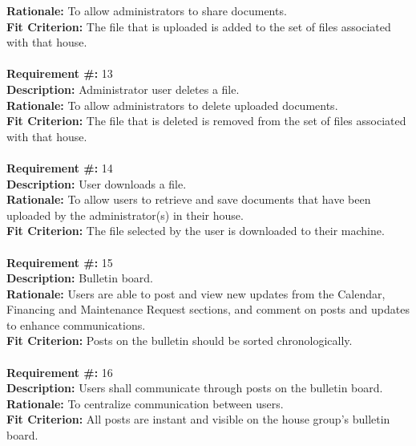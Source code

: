 \documentclass[12pt]{article}
\begin{document}
      \textbf{Rationale:} To allow administrators to share documents. \\
      \textbf{Fit Criterion:} The file that is uploaded is added to the set of
      files associated with that house. \\ \\
\textbf{Requirement \#:} 13
       \\
      \textbf{Description:} Administrator user deletes a file. \\
      \textbf{Rationale:} To allow administrators to delete uploaded documents. \\
      \textbf{Fit Criterion:} The file that is deleted is removed from the set of
      files associated with that house. \\ \\
\textbf{Requirement \#:} 14
       \\
      \textbf{Description:} User downloads a file. \\
      \textbf{Rationale:} To allow users to retrieve and save documents that 
have
      been uploaded by the administrator(s) in their house. \\
      \textbf{Fit Criterion:} The file selected by the user is downloaded to
      their machine. \\ \\
\textbf{Requirement \#:} 15
      \\
      \textbf{Description: }{Bulletin board.} \\
      \textbf{Rationale: }{Users are able to post and view new updates from the Calendar, Financing and Maintenance Request sections, and 
comment on posts and updates to enhance communications.} \\
      \textbf{Fit Criterion: }{Posts on the bulletin should be sorted 
chronologically.} \\ \\      
\textbf{Requirement \#:} 16 
       \\
      \textbf{Description:} Users shall communicate through posts on the bulletin board. \\
      \textbf{Rationale:} To centralize communication between users. \\
      \textbf{Fit Criterion:} All posts are instant and visible on the house group's bulletin board.  \\ \\ 
\end{document}
